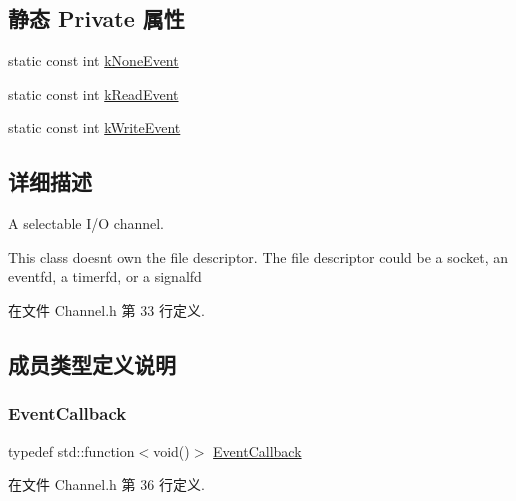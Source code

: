 \subsection*{静态 Private 属性}
\begin{DoxyCompactItemize}
\item 
static const int \hyperlink{classmuduo_1_1net_1_1Channel_a7873ae2887674cb643986d9f04745444}{k\+None\+Event}
\item 
static const int \hyperlink{classmuduo_1_1net_1_1Channel_a7a33491041233f79f0686805e1844694}{k\+Read\+Event}
\item 
static const int \hyperlink{classmuduo_1_1net_1_1Channel_a050e3f1da6130199bfa2619a60e43f3b}{k\+Write\+Event}
\end{DoxyCompactItemize}


\subsection{详细描述}
A selectable I/O channel.

This class doesn\textquotesingle{}t own the file descriptor. The file descriptor could be a socket, an eventfd, a timerfd, or a signalfd 

在文件 Channel.\+h 第 33 行定义.



\subsection{成员类型定义说明}
\mbox{\label{classmuduo_1_1net_1_1Channel_aefcb94d55a02528f90f3aa028191dcb2}} 
\subsubsection{\texorpdfstring{Event\+Callback}{EventCallback}}
{\footnotesize\ttfamily typedef std\+::function$<$void()$>$ \hyperlink{classmuduo_1_1net_1_1Channel_aefcb94d55a02528f90f3aa028191dcb2}{Event\+Callback}}



在文件 Channel.\+h 第 36 行定义.

\mbox{\label{classmuduo_1_1net_1_1Channel_ae78e1c2582cc5d60cd1a4506851e8991}} 
